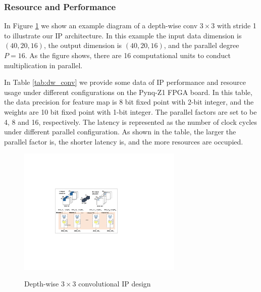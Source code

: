 \documentclass[a4paper, 11pt]{article}
\begin{document}
    

\subsubsection{Resource and Performance} 
\quad

In Figure \ref{fig:3x3IP} we show an example diagram of a depth-wise conv $3\times 3$ with stride 1 to illustrate our IP architecture. In this example the input data dimension is $(40, 20, 16)$, the output dimension is $(40, 20, 16)$, and the parallel degree $P=16$. As the figure shows, there are 16 computational units to conduct multiplication in parallel.


In Table \ref{tab:dw_conv} we provide some data of IP performance and resource usage under different configurations on the Pynq-Z1 FPGA board.
In this table, the data precision for feature map is 8 bit fixed point with 2-bit integer, and the weights are 10 bit fixed point with 1-bit integer. The parallel factors are set to be 4, 8 and 16, respectively. The latency is represented as the number of clock cycles under different parallel configuration. As shown in the table, the larger the parallel factor is, the shorter latency is, and the more resources are occupied.




\begin{figure}
  \centering
  \includegraphics[width=0.7\textwidth]{dw_3x3.pdf}\\
  \vspace{-12pt}
  \caption{Depth-wise $3 \times 3$ convolutional IP design}\label{fig:3x3IP}
  \vspace{-12pt}
\end{figure}
\end{document}
